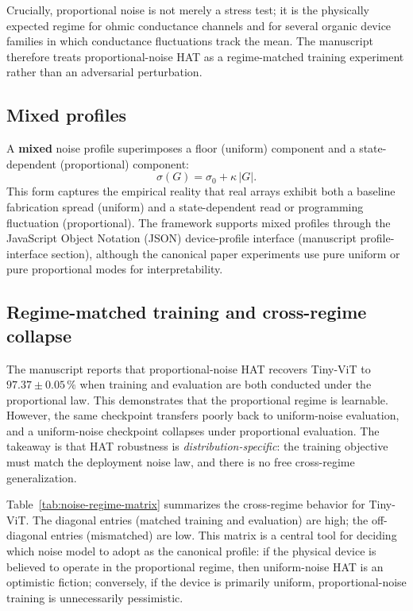 Crucially, proportional noise is not merely a stress test; it is the physically expected regime for ohmic conductance channels and for several organic device families in which conductance fluctuations track the mean. The manuscript therefore treats proportional-noise HAT as a regime-matched training experiment rather than an adversarial perturbation.

\subsection{Mixed profiles}

A \textbf{mixed} noise profile superimposes a floor (uniform) component and a state-dependent (proportional) component:
\begin{equation}
    \sigma(G) = \sigma_{0} + \kappa\,|G|.
\end{equation}
This form captures the empirical reality that real arrays exhibit both a baseline fabrication spread (uniform) and a state-dependent read or programming fluctuation (proportional). The framework supports mixed profiles through the JavaScript Object Notation (JSON) device-profile interface (manuscript profile-interface section), although the canonical paper experiments use pure uniform or pure proportional modes for interpretability.

\subsection{Regime-matched training and cross-regime collapse}

The manuscript reports that proportional-noise HAT recovers Tiny-ViT to $97.37\pm0.05\,\%$ when training and evaluation are both conducted under the proportional law. This demonstrates that the proportional regime is learnable. However, the same checkpoint transfers poorly back to uniform-noise evaluation, and a uniform-noise checkpoint collapses under proportional evaluation. The takeaway is that HAT robustness is \emph{distribution-specific}: the training objective must match the deployment noise law, and there is no free cross-regime generalization.

Table~\ref{tab:noise-regime-matrix} summarizes the cross-regime behavior for Tiny-ViT. The diagonal entries (matched training and evaluation) are high; the off-diagonal entries (mismatched) are low. This matrix is a central tool for deciding which noise model to adopt as the canonical profile: if the physical device is believed to operate in the proportional regime, then uniform-noise HAT is an optimistic fiction; conversely, if the device is primarily uniform, proportional-noise training is unnecessarily pessimistic.

